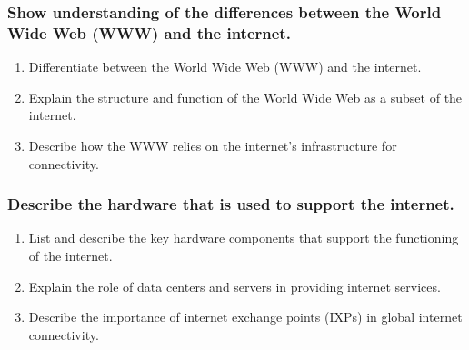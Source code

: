 \documentclass[a4paper]{article}
\begin{document}
\subsubsection{Show understanding of the differences between the World Wide Web (WWW) and the internet.}
\begin{enumerate}
  \item Differentiate between the World Wide Web (WWW) and the internet.
  \item Explain the structure and function of the World Wide Web as a subset of the internet.
  \item Describe how the WWW relies on the internet's infrastructure for connectivity.
\end{enumerate}

\subsubsection{Describe the hardware that is used to support the internet.}
\begin{enumerate}
  \item List and describe the key hardware components that support the functioning of the internet.
  \item Explain the role of data centers and servers in providing internet services.
  \item Describe the importance of internet exchange points (IXPs) in global internet connectivity.
\end{enumerate}
\end{document}
